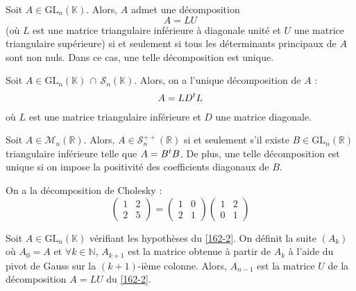 	\begin{theorem}
		\label{162-2}
		Soit $A \in \mathrm{GL}_n(\mathbb{K})$. Alors, $A$ admet une décomposition
		\[ A = LU \]
		(où $L$ est une matrice triangulaire inférieure à diagonale unité et $U$ une matrice triangulaire supérieure) si et seulement si tous les déterminants principaux de $A$ sont non nuls. Dans ce cas, une telle décomposition est unique.
	\end{theorem}
	
	\begin{corollary}
		Soit $A \in \mathrm{GL}_n(\mathbb{K}) \, \cap \, \mathcal{S}_n(\mathbb{K})$. Alors, on a l'unique décomposition de $A$ :
		\[ A = LD\mathstrut ^t L \]
		où $L$ est une matrice triangulaire inférieure et $D$ une matrice diagonale.
	\end{corollary}
	
	\begin{application}
		Soit $A \in \mathcal{M}_n(\mathbb{R})$. Alors, $A \in \mathcal{S}_n^{++}(\mathbb{R})$ si et seulement s'il existe $B \in \mathrm{GL}_n(\mathbb{R})$ triangulaire inférieure telle que $A = B\mathstrut ^t B$. De plus, une telle décomposition est unique si on impose la positivité des coefficients diagonaux de $B$.
	\end{application}
	
	
	\begin{example}
		On a la décomposition de Cholesky :
		\[ \begin{pmatrix} 1 & 2 \\ 2 & 5 \end{pmatrix} = \begin{pmatrix} 1 & 0 \\ 2 & 1 \end{pmatrix} \begin{pmatrix} 1 & 2 \\ 0 & 1 \end{pmatrix} \]
	\end{example}
	
	
	\begin{proposition}
		Soit $A \in \mathrm{GL}_n(\mathbb{K})$ vérifiant les hypothèses du \cref{162-2}. On définit la suite $(A_k)$ où $A_0 = A$ et $\forall k \in \mathbb{N}$, $A_{k+1}$ est la matrice obtenue à partir de $A_k$ à l'aide du pivot de Gauss sur la $(k+1)$-ième colonne. Alors, $A_{n-1}$ est la matrice $U$ de la décomposition $A = LU$ du \cref{162-2}.
	\end{proposition}
	
